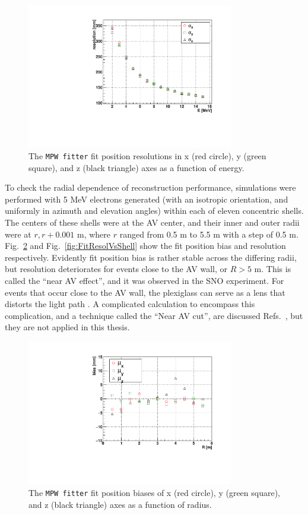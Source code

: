 \begin{figure}[htbp]
	\centering	
	\includegraphics[width=9cm]{MPW_isoFill_posResolVsE.pdf}
	\caption[The \texttt{MPW fitter} fit position resolutions ($\sigma_{x,y,z}$) as a function of energy.]{The \texttt{MPW fitter} fit position resolutions in x (red circle), y (green square), and z (black triangle) axes as a function of energy.}
	\label{fig:MPWposResol_isoFill}
\end{figure}

To check the radial dependence of reconstruction performance, simulations were performed with 5 MeV electrons generated (with an isotropic orientation, and uniformly in azimuth and elevation angles) within each of eleven concentric shells. The centers of these shells were at the AV center, and their inner and outer radii were at $r, r+0.001$ m, where $r$ ranged from 0.5 m to 5.5 m with a step of 0.5 m. Fig.~\ref{fig:FitBiasVsShell} and Fig.~\ref{fig:FitResolVsShell} show the fit position bias and resolution respectively. Evidently fit position bias is rather stable across the differing radii, but resolution deteriorates for events close to the AV wall, or $R>5$ m. This is called the ``near AV effect'', and it was observed in the SNO experiment. For events that occur close to the AV wall, the plexiglass can serve as a lens that distorts the light path \cite{brice1996monte}. A complicated calculation to encompass this complication, and a technique called the ``Near AV cut'', are discussed Refs.~\cite{coulter2013modelling,jones2011background}, but they are not applied in this thesis. 

\begin{figure}[htbp]
	\centering	
	\includegraphics[width=9cm]{shellTest_RvsBias.pdf}
	\caption[The \texttt{MPW fitter} fit position biases ($\mu_{x,y,z}$) as a function of energies.]{The \texttt{MPW fitter} fit position biases of x (red circle), y (green square), and z (black triangle) axes as a function of radius.}
	\label{fig:FitBiasVsShell}
\end{figure}

